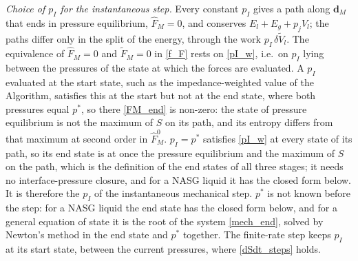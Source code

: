 \emph{Choice of $p_I$ for the instantaneous step.} Every constant $p_I$ gives a path along $\boldsymbol{d}_M$ that ends in pressure equilibrium, $\hat{F}_M=0$, and conserves $E_l+E_g+p_{j}V_l$; the paths differ only in the split of the energy, through the work $p_I\,\delta\tilde{V}_l$. The equivalence of $\hat{F}_M=0$ and $\tilde{F}_M=0$ in \eqref{f_F} rests on \eqref{pI_w}, i.e.\ on $p_I$ lying between the pressures of the state at which the forces are evaluated. A $p_I$ evaluated at the start state, such as the impedance-weighted value of the Algorithm, satisfies this at the start but not at the end state, where both pressures equal $p^*$, so there \eqref{FM_end} is non-zero: the state of pressure equilibrium is not the maximum of $S$ on its path, and its entropy differs from that maximum at second order in $\hat{F}_M^0$. $p_I=p^*$ satisfies \eqref{pI_w} at every state of its path, so its end state is at once the pressure equilibrium and the maximum of $S$ on the path, which is the definition of the end states of all three stages; it needs no interface-pressure closure, and for a NASG liquid it has the closed form below. It is therefore the $p_I$ of the instantaneous mechanical step. $p^*$ is not known before the step: for a NASG liquid the end state has the closed form below, and for a general equation of state it is the root of the system \eqref{mech_end}, solved by Newton's method in the end state and $p^*$ together. The finite-rate step keeps $p_I$ at its start state, between the current pressures, where \eqref{dSdt_steps} holds.


